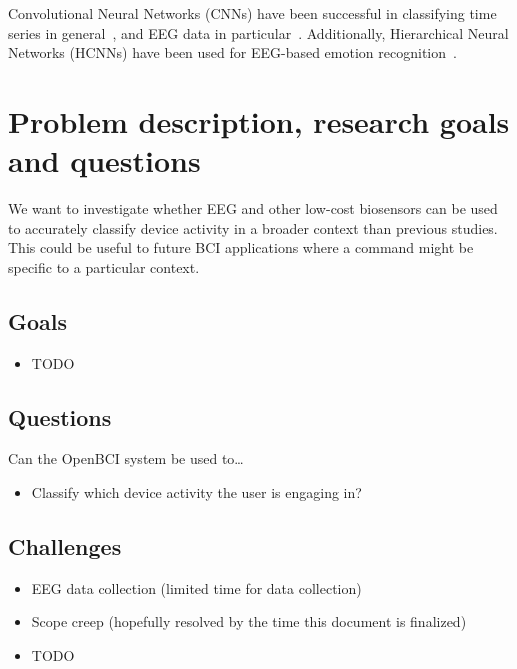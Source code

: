 \documentclass{IEEEtran}
\begin{document}
Convolutional Neural Networks (CNNs) have been successful in classifying time series in general~\cite{zhao_convolutional_2017}, and EEG data in particular~\cite{schirrmeister_deep_2017}. Additionally, Hierarchical Neural Networks (HCNNs) have been used for EEG-based emotion recognition~\cite{li_hierarchical_2018}.


\section{Problem description, research goals and questions}

We want to investigate whether EEG and other low-cost biosensors can be used to accurately classify device activity in a broader context than previous studies. This could be useful to future BCI applications where a command might be specific to a particular context.

\subsection{Goals}

\begin{itemize}
    \item{TODO}
\end{itemize}

\subsection{Questions}

Can the OpenBCI system be used to\ldots

\begin{itemize}
    \item Classify which device activity the user is engaging in?
\end{itemize}

\subsection{Challenges}

\begin{itemize}
    \item EEG data collection (limited time for data collection)
    \item Scope creep (hopefully resolved by the time this document is finalized)
    \item TODO
\end{itemize}
\end{document}
